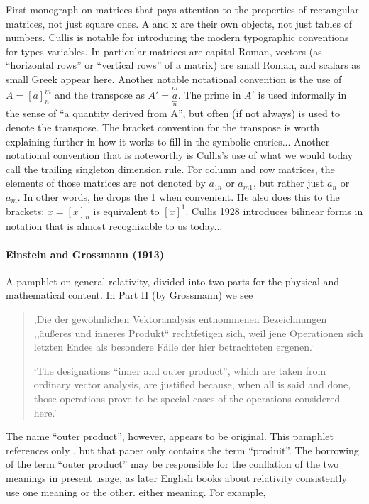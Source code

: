 First monograph on matrices that pays attention to the properties of rectangular matrices, not just square ones.
A and x are their own objects, not just tables of numbers.
Cullis is notable for introducing the modern typographic conventions for types variables. In particular matrices are capital Roman, vectors (as ``horizontal rows'' or ``vertical rows'' of a matrix) are small Roman, and scalars as small Greek appear here.
Another notable notational convention is the use of $A = [a]^m_n$ and the transpose as $A' = \overbracket{\underbracket{a}}^m_n$. The prime in $A'$ is used informally in the sense of ``a quantity derived from A'', but often (if not always) is used to denote the transpose.
The bracket convention for the transpose is worth explaining further in how it works to fill in the symbolic entries...
Another notational convention that is noteworthy is Cullis's use of what we would today call the trailing singleton dimension rule. For column and row matrices, the elements of those matrices are not denoted by $a_{1n}$ or $a_{m1}$, but rather just $a_n$ or $a_m$. In other words, he drops the 1 when convenient. He also does this to the brackets: $x = [x]_n$ is equivalent to $[x]^1$.
Cullis 1928 introduces bilinear forms in notation that is almost recognizable to us today...



\paragraph{Einstein and Grossmann (1913)}

A pamphlet on general relativity, divided into two parts for the physical and mathematical content. In Part II (by Grossmann) we see

\begin{quote}

,Die der gewöhnlichen Vektoranalysis entnommenen Bezeichnungen ,,äußeres und inneres Produkt`` rechtfetigen sich, weil jene Operationen sich letzten Endes als besondere Fälle der hier betrachteten ergenen.`~\cite[p. 26]{Einstein1913}\cite[p. 327]{Einstein1995}

`The designations ``inner and outer product'', which are taken from ordinary vector analysis, are justified because, when all is said and done, those operations prove to be special cases of the operations considered here.'~\cite[p. 175]{Einstein1996}
\end{quote}
The name ``outer product'', however, appears to be original. This pamphlet references only \cite{Ricci1900}, but that paper only contains the term ``produit''.
The borrowing of the term ``outer product'' may be responsible for the conflation of the two meanings in present usage, as later English books about relativity consistently use one meaning or the other. either meaning. For example,

